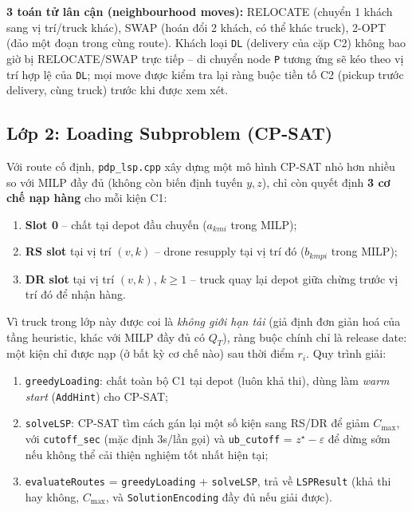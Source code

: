 \documentclass[12pt,a4paper]{article}
\begin{document}
\textbf{3 toán tử lân cận (neighbourhood moves):} RELOCATE (chuyển 1 khách sang vị
trí/truck khác), SWAP (hoán đổi 2 khách, có thể khác truck), 2-OPT (đảo một đoạn
trong cùng route). Khách loại \texttt{DL} (delivery của cặp C2) không bao giờ bị
RELOCATE/SWAP trực tiếp -- di chuyển node \texttt{P} tương ứng sẽ kéo theo vị trí hợp
lệ của \texttt{DL}; mọi move được kiểm tra lại ràng buộc tiền tố C2 (pickup trước
delivery, cùng truck) trước khi được xem xét.

\subsection{Lớp 2: Loading Subproblem (CP-SAT)}

Với route cố định, \texttt{pdp\_lsp.cpp} xây dựng một mô hình CP-SAT nhỏ hơn nhiều
so với MILP đầy đủ (không còn biến định tuyến $y, z$), chỉ còn quyết định
\textbf{3 cơ chế nạp hàng} cho mỗi kiện C1:
\begin{enumerate}
    \item \textbf{Slot 0} -- chất tại depot đầu chuyến ($a_{kmi}$ trong MILP);
    \item \textbf{RS slot} tại vị trí $(v,k)$ -- drone resupply tại vị trí đó
    ($b_{kmpi}$ trong MILP);
    \item \textbf{DR slot} tại vị trí $(v,k)$, $k\ge 1$ -- truck quay lại depot giữa
    chừng trước vị trí đó để nhận hàng.
\end{enumerate}
Vì truck trong lớp này được coi là \emph{không giới hạn tải} (giả định đơn giản hoá
của tầng heuristic, khác với MILP đầy đủ có $Q_T$), ràng buộc chính chỉ là release
date: một kiện chỉ được nạp (ở bất kỳ cơ chế nào) sau thời điểm $r_i$. Quy trình giải:
\begin{enumerate}
    \item \texttt{greedyLoading}: chất toàn bộ C1 tại depot (luôn khả thi), dùng làm
    \emph{warm start} (\texttt{AddHint}) cho CP-SAT;
    \item \texttt{solveLSP}: CP-SAT tìm cách gán lại một số kiện sang RS/DR để giảm
    $C_{\max}$, với \texttt{cutoff\_sec} (mặc định 3s/lần gọi) và \texttt{ub\_cutoff}
    = $z^\star - \varepsilon$ để dừng sớm nếu không thể cải thiện nghiệm tốt nhất
    hiện tại;
    \item \texttt{evaluateRoutes} = \texttt{greedyLoading} + \texttt{solveLSP}, trả
    về \texttt{LSPResult} (khả thi hay không, $C_{\max}$, và \texttt{SolutionEncoding}
    đầy đủ nếu giải được).
\end{enumerate}
\end{document}
